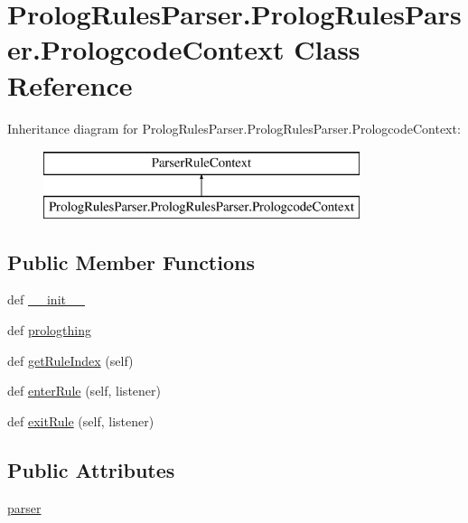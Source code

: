 \hypertarget{class_prolog_rules_parser_1_1_prolog_rules_parser_1_1_prologcode_context}{}\section{Prolog\+Rules\+Parser.\+Prolog\+Rules\+Parser.\+Prologcode\+Context Class Reference}
\label{class_prolog_rules_parser_1_1_prolog_rules_parser_1_1_prologcode_context}
Inheritance diagram for Prolog\+Rules\+Parser.\+Prolog\+Rules\+Parser.\+Prologcode\+Context\+:\begin{figure}[H]
\begin{center}
\leavevmode
\includegraphics[height=2.000000cm]{class_prolog_rules_parser_1_1_prolog_rules_parser_1_1_prologcode_context}
\end{center}
\end{figure}
\subsection*{Public Member Functions}
\begin{DoxyCompactItemize}
\item 
def \hyperlink{class_prolog_rules_parser_1_1_prolog_rules_parser_1_1_prologcode_context_a6f6aea39505b5ff6a59388d6cdf31d20}{\+\_\+\+\_\+init\+\_\+\+\_\+}
\item 
def \hyperlink{class_prolog_rules_parser_1_1_prolog_rules_parser_1_1_prologcode_context_a3464e8f77e5f685ce6c5515288daefd7}{prologthing}
\item 
def \hyperlink{class_prolog_rules_parser_1_1_prolog_rules_parser_1_1_prologcode_context_a608138f614b771027a20b0ad895b459c}{get\+Rule\+Index} (self)
\item 
def \hyperlink{class_prolog_rules_parser_1_1_prolog_rules_parser_1_1_prologcode_context_a69432ab3fc86b526906f3266d8e32abb}{enter\+Rule} (self, listener)
\item 
def \hyperlink{class_prolog_rules_parser_1_1_prolog_rules_parser_1_1_prologcode_context_a25525a91037c63f70d4515520c27c8fa}{exit\+Rule} (self, listener)
\end{DoxyCompactItemize}
\subsection*{Public Attributes}
\begin{DoxyCompactItemize}
\item 
\hyperlink{class_prolog_rules_parser_1_1_prolog_rules_parser_1_1_prologcode_context_aec10e505a5b74230b5f4b49a9d7da40a}{parser}
\end{DoxyCompactItemize}


